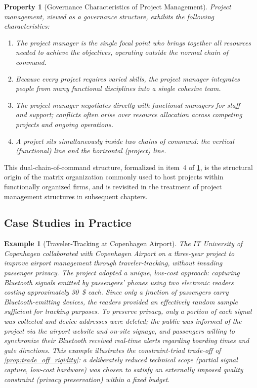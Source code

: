 \documentclass[12pt, a4paper]{report}
\theoremstyle{engnotes}
\newtheorem{property}{Property}[section]
\newtheorem{example}{Example}[section]
\begin{document}
\begin{property}[Governance Characteristics of Project Management]\label{pty:governance_characteristics}
    Project management, viewed as a governance structure, exhibits the following characteristics:
    \begin{enumerate}
        \item The project manager is the single focal point who brings together all resources needed to achieve the objectives, operating outside the normal chain of command.
        \item Because every project requires varied skills, the project manager integrates people from many functional disciplines into a single cohesive team.
        \item The project manager negotiates directly with functional managers for staff and support; conflicts often arise over resource allocation across competing projects and ongoing operations.
        \item A project sits simultaneously inside two chains of command: the vertical (functional) line and the horizontal (project) line.
    \end{enumerate}
\end{property}

This dual-chain-of-command structure, formalized in item~4 of \cref{pty:governance_characteristics}, is the structural origin of the matrix organization commonly used to host projects within functionally organized firms, and is revisited in the treatment of project management structures in subsequent chapters.

\subsection{Case Studies in Practice}
\label{subsec:case_studies}

\begin{example}[Traveler-Tracking at Copenhagen Airport]\label{ex:copenhagen_airport}
    The IT University of Copenhagen collaborated with Copenhagen Airport on a three-year project to improve airport management through traveler-tracking, without invading passenger privacy. The project adopted a unique, low-cost approach: capturing Bluetooth signals emitted by passengers' phones using two electronic readers costing approximately \qty{30}{\$} each. Since only a fraction of passengers carry Bluetooth-emitting devices, the readers provided an effectively random sample sufficient for tracking purposes. To preserve privacy, only a portion of each signal was collected and device addresses were deleted; the public was informed of the project via the airport website and on-site signage, and passengers willing to synchronize their Bluetooth received real-time alerts regarding boarding times and gate directions. This example illustrates the constraint-triad trade-off of \cref{prop:trade_off_rigidity}: a deliberately reduced technical scope (partial signal capture, low-cost hardware) was chosen to satisfy an externally imposed quality constraint (privacy preservation) within a fixed budget.
\end{example}
\end{document}
